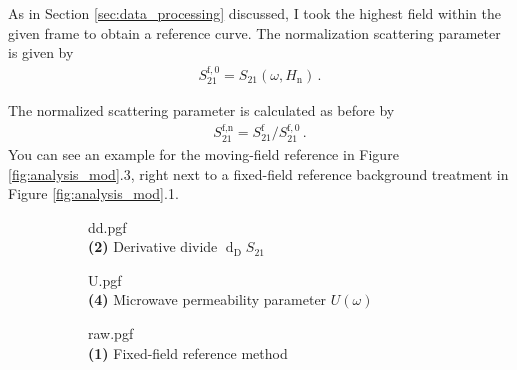 As in Section \ref{sec:data_processing} discussed, I took the highest field within the given frame to obtain a reference curve. The normalization scattering parameter is given by
\begin{align}
    S_{21}^{\text{f},0}=S_{21}(\omega,H_\text{n})\,.
\end{align}

The normalized scattering parameter is calculated as before by
\begin{align}
    S_{21}^{\text{f},\text{n}}=S_{21}^\text{f}/S_{21}^{\text{f},0}\,.
\end{align}
You can see an example for the moving-field reference in Figure \ref{fig:analysis_mod}.3, right next to a fixed-field reference background treatment in Figure \ref{fig:analysis_mod}.1. \cite{maierflaig2017,siegl2020}
\begin{figure}
     \centering
     \begin{turn}{90}
     \begin{subfigure}[b]{3.65in}
         \hspace{.2in}
         {dd.pgf}\\
         \centering\small\textbf{(2)} Derivative divide $\operatorname{d}_\text{D}S_{21}$\\
     \end{subfigure}
     \end{turn}
     \hspace{.2in}
     \begin{turn}{90}
     \begin{subfigure}[b]{3.65in}
         \hspace{.2in}
         {U.pgf}\\
         \centering\small\textbf{(4)} Microwave permeability parameter $U(\omega)$\\
     \end{subfigure}
     \end{turn}
     \begin{turn}{90}
     \begin{subfigure}[b]{4in}
         \centering
         {raw.pgf}\\
         \centering\small\textbf{(1)} Fixed-field reference method\\

\end{subfigure}
\end{turn}
\end{figure}
